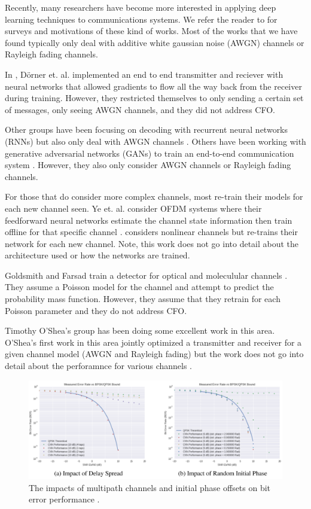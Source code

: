 Recently, many researchers have become more interested in applying deep learning techniques to communications systems.  
We refer the reader to \cite{botoca}\cite{diamandis}\cite{wang}\cite{hemodel}\cite{osheaphys} for surveys and motivations of these kind of works.  
Most of the works that we have found typically only deal with additive white gaussian noise (AWGN) channels or Rayleigh fading channels.

In \cite{dorner2017}, D\"{o}rner et. al. implemented an end to end transmitter and reciever with neural networks that allowed gradients to flow all the way back from the receiver during training.  
However, they restricted themselves to only sending a certain set of messages, only seeing AWGN channels, and they did not address CFO. 

Other groups have been focusing on decoding with recurrent neural networks (RNNs) but also only deal with AWGN channels \cite{kim2018}\cite{kimnips}.  
Others have been working with generative adversarial networks (GANs) to train an end-to-end communication system \cite{yegans}.  However, they also only consider AWGN channels or Rayleigh fading channels.

For those that do consider more complex channels, most re-train their models for each new channel seen.  Ye et. al. consider OFDM systems where their feedforward neural networks estimate the channel state information then train offline for that specific channel \cite{ye2018}.  
\cite{raghavendra} considers nonlinear channels but re-trains their network for each new channel.  Note, this work does not go into detail about the architecture used or how the networks are trained. 

Goldsmith and Farsad train a detector for optical and moleculular channels \cite{farsad2018}.  They assume a Poisson model for the channel and attempt to predict the probability mass function.  However, they assume that they retrain for each Poisson parameter and they do not address CFO.

Timothy O'Shea's group has been doing some excellent work in this area. 
O'Shea's first work in this area jointly optimized a transmitter and receiver for a given channel model (AWGN and Rayleigh fading) but the work does not go into detail about the perforamnce for various channels \cite{osheaphys}.

\begin{figure}
\begin{center}
\includegraphics[width=16cm]{figures/osheaatt2.png}
\caption{The impacts of multipath channels and initial phase offsets on bit error performance \cite{osheaatt}.}
\end{center}
\label{fig:oshea}
\end{figure}


